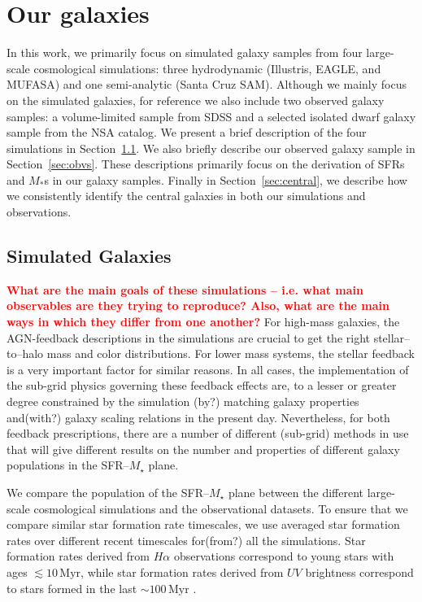 \documentclass[preprint2,tighten]{aastex62}
\newcommand{\todo}[1]{{\bf \textcolor{red}{ #1}}}
\begin{document}
\section{Our galaxies} \label{sec:ourgals}
In this work, we primarily focus on simulated galaxy samples from four 
large-scale cosmological simulations: three hydrodynamic (Illustris, EAGLE, 
and MUFASA) and one semi-analytic (Santa Cruz SAM). Although we mainly 
focus on the simulated galaxies, for reference we also include two observed 
galaxy samples: a volume-limited sample from SDSS and a selected isolated 
dwarf galaxy sample from the NSA catalog. We present a brief description of the
four simulations in Section~\ref{sec:galsims}. We also briefly
describe our observed galaxy sample in Section~\ref{sec:obvs}. These 
descriptions primarily focus on the derivation of SFRs and $M_*$s in our 
galaxy samples. Finally in Section~\ref{sec:central}, we describe how 
we consistently identify the central galaxies in both our simulations 
and observations. 

\subsection{Simulated Galaxies} \label{sec:galsims}
\todo{What are the main goals of these simulations -- i.e. what main observables are they trying to reproduce? Also, what are the main ways in which they differ from one another?}
For high-mass galaxies, the AGN-feedback descriptions in the simulations are crucial to get the right stellar--to--halo mass and color distributions. 
For lower mass systems, the stellar feedback is a very important factor for similar reasons. In all cases, the implementation of the sub-grid physics governing these feedback effects are, to a lesser or greater degree constrained by the simulation (by?) matching galaxy properties and(with?) galaxy scaling relations in the present day. Nevertheless, for both feedback prescriptions, there are a number of different (sub-grid) methods in use that will give different results on the number and properties of different galaxy populations in the SFR--$M_{\star}$ plane. 

We compare the population of the SFR--$M_{\star}$ plane between the different large-scale cosmological simulations and the observational datasets. To ensure that we compare similar star formation rate timescales, we use averaged star formation rates over different recent timescales for(from?) all the simulations. Star formation rates derived from $H{\alpha}$ observations correspond to young stars with ages $\lesssim 10\,\mathrm{Myr}$, while star formation rates derived from $UV$ brightness correspond to stars formed in the last $\sim 100\,\mathrm{Myr}$ \citep[e.g.][]{kennicutt2012}. 
\end{document}
